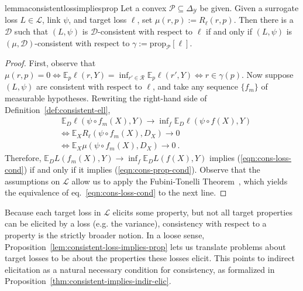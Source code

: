 \documentclass[11pt]{article} %
\newcommand{\Comments}{1}
\newcommand{\mytodo}[2]{\ifnum\Comments=1%
	\todo[linecolor=#1!80!black,backgroundcolor=#1,bordercolor=#1!80!black]{#2}\fi}
\newcommand{\raft}[1]{\mytodo{green!20!white}{RF: #1}}
\newcommand{\jessiet}[1]{\mytodo{purple!20!white}{JF: #1}}
\newcommand{\btw}[1]{}%
\newcommand{\reals}{\mathbb{R}}
\newcommand{\simplex}{\Delta_\Y}
\newcommand{\prop}[2][\mathcal{P}]{\mathrm{prop}_{#1}[#2]}
\newcommand{\propdis}{\mu}
\newcommand{\D}{\mathcal{D}}
\newcommand{\E}{\mathbb{E}}
\renewcommand{\L}{\mathcal{L}}
\newcommand{\R}{\mathcal{R}}
\renewcommand{\P}{\mathcal{P}}
\newcommand{\Y}{\mathcal{Y}}
\newcommand{\exploss}[3]{\E_{#3} #1(#2,Y)}
\begin{document}
\begin{restatable}[]{lemma}{consistentlossimpliesprop}\label{lem:consistent-loss-implies-prop}
	Let a convex $\P \subseteq \simplex$ be given.
	Given a surrogate loss $L \in \L$, link $\psi$, and target loss $\ell$, set
	$\mu(r,p) := R_\ell(r,p)$.
	Then there is a $\D$ such that
	$(L, \psi)$ is $\D$-consistent with respect to $\ell$ if and only if $(L,\psi)$ is $(\propdis, \D)$-consistent with respect to $\gamma := \prop{\ell}$. 
	\btw{Note: don't actually need $\gamma$ nonempty here.}
\end{restatable}

\begin{proof}
	First, observe that $\propdis(r,p) = 0 \iff \exploss{\ell}{r}{p} = \inf_{r' \in \R} \exploss{\ell}{r'}{p} \iff r \in \gamma(p)$.
	Now suppose $(L, \psi)$ are consistent with respect to $\ell$, and take any sequence $\{f_m\}$ of measurable hypotheses.
	Rewriting the right-hand side of Definition~\ref{def:consistent-ell},
	\begin{align}
	&\; \E_D \ell(\psi \circ f_m(X), Y)\to \inf\nolimits_f \E_D \ell(\psi \circ f(X), Y)   \label{eqn:cons-loss-cond} \\
	&\iff \E_X R_\ell(\psi \circ f_m(X), D_X) \to 0                               \nonumber  \\
	&\iff \E_X \propdis(\psi \circ f_m(X), D_X) \to 0~.~                          \label{eqn:cons-prop-cond}
	\end{align}
	Therefore, $\mathbb{E}_D L(f_m(X),Y) \to \inf_f \mathbb{E}_D L(f(X),Y)$ implies (\ref{eqn:cons-loss-cond}) if and only if it implies (\ref{eqn:cons-prop-cond}).
	Observe that the assumptions on $\L$ allow us to apply the Fubini-Tonelli Theorem~\cite[Theorem 2.37]{folland1999real}, which yields the equivalence of eq.~\ref{eqn:cons-loss-cond} to the next line.
\end{proof}

Because each target loss in $\L$ elicits some property, but not all target properties can be elicited by a loss (e.g. the variance), consistency with respect to a property is the strictly broader notion.
In a loose sense, Proposition~\ref{lem:consistent-loss-implies-prop} lets us translate problems about target losses to be about the properties these losses elicit.
This points to indirect elicitation as a natural necessary condition for consistency, as formalized in Proposition~\ref{thm:consistent-implies-indir-elic}.
\end{document}
